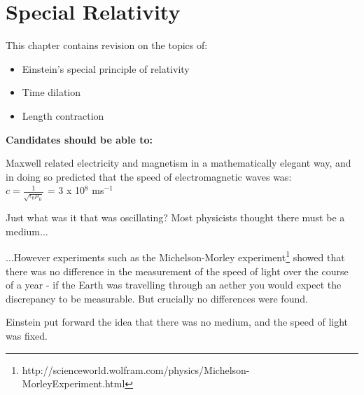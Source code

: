 \documentclass[revision-guide.tex]{subfiles}
\begin{document}
\chapter{Special Relativity}

This chapter contains revision on the topics of:

\begin {itemize}
\item Einstein’s special principle of relativity
\item Time dilation
\item Length contraction

\end {itemize}

\textbf{Candidates should be able to:}

Maxwell related electricity and magnetism in a mathematically elegant way, and in doing so predicted that the speed of electromagnetic waves was:
\\
 
$c=\frac{1}{\sqrt{\epsilon_0\mu_0}}$ = 3 x 10$^8$ ms$^{-1}$




Just what was it that was oscillating? Most physicists thought there must be a medium...


...However experiments such as the Michelson-Morley experiment\footnote{http://scienceworld.wolfram.com/physics/Michelson-MorleyExperiment.html} showed that there was no difference in the measurement of the speed of light over the course of a year - if the Earth was travelling through an aether you would expect the discrepancy to be measurable. But crucially no differences were found.



Einstein put forward the idea that there was no medium, and the speed of light was fixed.
\end{document}
